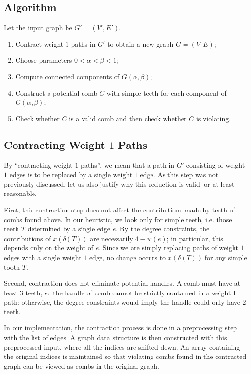 \documentclass[12pt, letterpaper]{amsart}
\theoremstyle{plain}
\theoremstyle{definition}
\theoremstyle{remark}
\begin{document}
\subsection{Algorithm}
Let the input graph be $G' = (V',E')$.
\begin{enumerate}
  \item Contract weight $1$ paths in $G'$ to obtain a new graph $G = (V,E)$;
  \item Choose parameters $0 < \alpha < \beta < 1$;
  \item Compute connected components of $G(\alpha,\beta)$;
  \item Construct a potential comb $C$ with simple teeth for each component of $G(\alpha,\beta)$;
  \item Check whether $C$ is a valid comb and then check whether $C$ is
    violating.
\end{enumerate}

\subsection{Contracting Weight $1$ Paths}
By ``contracting weight $1$ paths'', we mean that a path in $G'$ consisting of
weight $1$ edges is to be replaced by a single weight $1$ edge. As this step was
not previously discussed, let us also justify why this reduction is valid, or at
least reasonable.

First, this contraction step does not affect the contributions made by teeth of
combs found above. In our heuristic, we look only for simple teeth, i.e. those
teeth $T$ determined by a single edge $e$. By the degree constraints, the
contributions of $x(\delta(T))$ are necessarily $4 - w(e)$; in particular, this
depends only on the weight of $e$. Since we are simply replacing paths of
weight $1$ edges with a single weight $1$ edge, no change occurs to
$x(\delta(T))$ for any simple tooth $T$.

Second, contraction does not eliminate potential handles. A comb must have at
least $3$ teeth, so the handle of comb cannot be strictly contained in a weight
$1$ path: otherwise, the degree constraints would imply the handle could only
have $2$ teeth.

In our implementation, the contraction process is done in a preprocessing step
with the list of edges. A graph data structure is then constructed with this
preprocessed input, where all the indices are shifted down. An array containing
the original indices is maintained so that violating combs found in the
contracted graph can be viewed as combs in the original graph.
\end{document}
